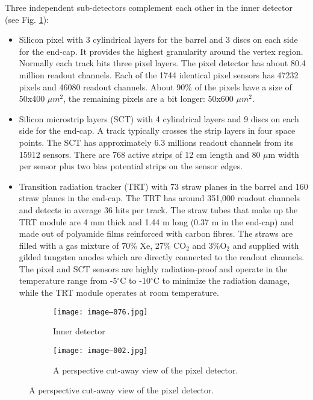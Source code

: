 		Three independent sub-detectors complement each other in the inner detector (see Fig. \ref{fig::id_a}):
		\begin{itemize}
		\item Silicon pixel with 3 cylindrical layers for the barrel and 3 discs on each side for the end-cap. It provides the highest granularity around the vertex region. Normally each track hits three pixel layers. The pixel detector has about 80.4 million readout channels. Each of the 1744 identical pixel sensors has 47232 pixels and 46080 readout channels. About 90\% of the pixels have a size of 50x400 $\mu m^2$, the remaining pixels are a bit longer: 50x600 $\mu m^2$.
		\item Silicon microstrip layers (SCT) with 4 cylindrical layers and 9 discs on each side for the end-cap. A track typically crosses the strip layers in four space points. The SCT has approximately 6.3 millions readout channels from its 15912 sensors. There are 768 active strips of 12 cm length and 80 $\mu$m width per sensor plus two bias potential strips on the sensor edges.
		\item Transition radiation tracker (TRT) with 73 straw planes in the barrel and 160 straw planes in the end-cap. The TRT has around 351,000 readout channels and detects in average 36 hits per track. The straw tubes that make up the TRT module are 4 mm thick and 1.44 m long (0.37 m in the end-cap) and made out of polyamide films reinforced with carbon fibres. The straws are filled with a gas mixture of 70\% Xe, 27\% CO$_2$ and 3\%O$_2$ and supplied with gilded tungsten anodes which are directly connected to the readout channels.
		The pixel and SCT sensors are highly radiation-proof and operate in the temperature range from -5$^\circ$C to -10$^\circ$C to minimize the radiation damage, while the TRT module operates at room temperature.	
		\end{itemize}
		\begin{figure}[htbp]
			\begin{subfigure}[t]{0.48\textwidth}
				\texttt{[image: image--076.jpg]}
				\caption[Inner detector]{Inner detector}
				\label{fig::id_a}
			\end{subfigure}
		                \hfill
			\begin{subfigure}[t]{0.48\textwidth}
				\texttt{[image: image--002.jpg]}
				\caption[Pixel detector]{A perspective cut-away view of the pixel detector.}
				\label{fig::pd_b}
			\end{subfigure}
			\label{fig::cfrs}
		\end{figure}
